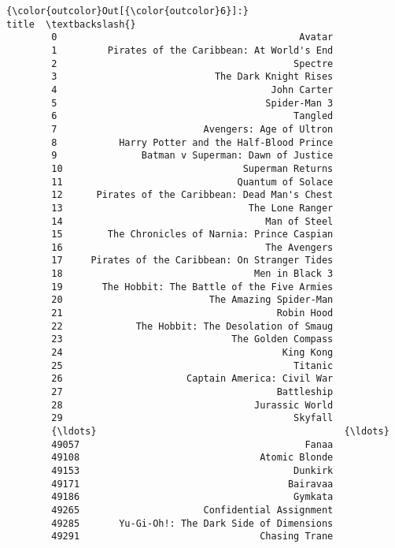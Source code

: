 \documentclass[11pt]{article}
\begin{document}
\begin{Verbatim}[commandchars=\\\{\}]
{\color{outcolor}Out[{\color{outcolor}6}]:}                                              title  \textbackslash{}
        0                                           Avatar   
        1         Pirates of the Caribbean: At World's End   
        2                                          Spectre   
        3                            The Dark Knight Rises   
        4                                      John Carter   
        5                                     Spider-Man 3   
        6                                          Tangled   
        7                          Avengers: Age of Ultron   
        8           Harry Potter and the Half-Blood Prince   
        9               Batman v Superman: Dawn of Justice   
        10                                Superman Returns   
        11                               Quantum of Solace   
        12      Pirates of the Caribbean: Dead Man's Chest   
        13                                 The Lone Ranger   
        14                                    Man of Steel   
        15        The Chronicles of Narnia: Prince Caspian   
        16                                    The Avengers   
        17     Pirates of the Caribbean: On Stranger Tides   
        18                                  Men in Black 3   
        19       The Hobbit: The Battle of the Five Armies   
        20                          The Amazing Spider-Man   
        21                                      Robin Hood   
        22             The Hobbit: The Desolation of Smaug   
        23                              The Golden Compass   
        24                                       King Kong   
        25                                         Titanic   
        26                      Captain America: Civil War   
        27                                      Battleship   
        28                                  Jurassic World   
        29                                         Skyfall   
        {\ldots}                                            {\ldots}   
        49057                                        Fanaa   
        49108                                Atomic Blonde   
        49153                                      Dunkirk   
        49171                                     Bairavaa   
        49186                                      Gymkata   
        49265                      Confidential Assignment   
        49285       Yu-Gi-Oh!: The Dark Side of Dimensions   
        49291                                Chasing Trane   

\end{Verbatim}
\end{document}
